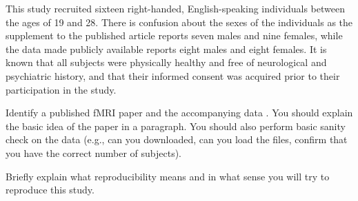 
\par

\par \indent This study recruited sixteen right-handed, English-speaking individuals between the ages of 19 and 28. There is confusion about the sexes of the individuals as the supplement to the published article reports seven males and nine females, while the data made publicly available reports eight males and eight females. It is known that all subjects were physically healthy and free of neurological and psychiatric history, and that their informed consent was acquired prior to their participation in the study.


Identify a published fMRI paper and the accompanying data
\cite{lindquist2008statistical}.  You should explain the basic idea of the
paper in a paragraph.  You should also perform basic sanity check on the data
(e.g., can you downloaded, can you load the files, confirm that you have the
correct number of subjects).

Briefly explain what reproducibility means and in what sense you will
try to reproduce this study.

